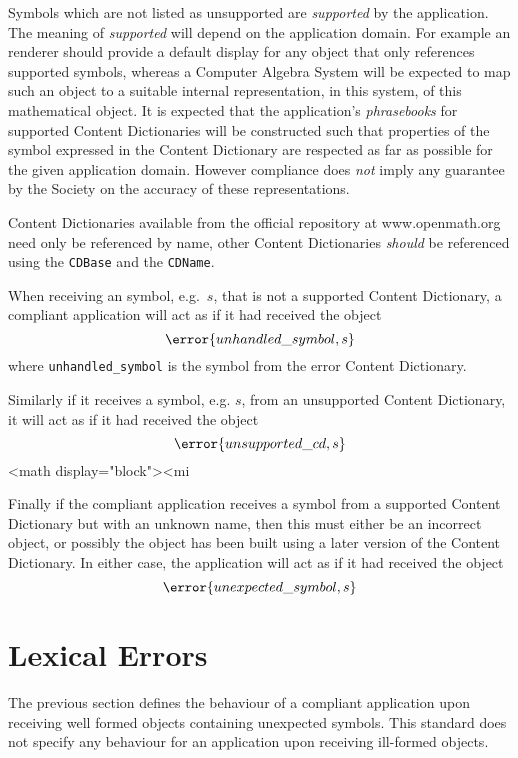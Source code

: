 Symbols which are not listed as unsupported are \emph{supported} by the application. The
meaning of \emph{supported} will depend on the application domain. For example an \OM
renderer should provide a default display for any \OM object that only references
supported symbols, whereas a Computer Algebra System will be expected to map such an
object to a suitable internal representation, in this system, of this mathematical
object. It is expected that the application's \emph{phrasebooks} for supported Content
Dictionaries will be constructed such that properties of the symbol expressed in the
Content Dictionary are respected as far as possible for the given application
domain. However \OM compliance does \emph{not} imply any guarantee by the \OM Society on
the accuracy of these representations.

Content Dictionaries available from the official \OM repository at www.openmath.org need
only be referenced by name, other Content Dictionaries \emph{should} be referenced using
the \lstinline|CDBase| and the \lstinline|CDName|.


When receiving an \OM symbol, e.g.~$s$, that is not a supported Content Dictionary, a
compliant application will act as if it had received the \OM object 
\[\error{unhandled\_symbol,s}\]
where \lstinline|unhandled_symbol| is the symbol from the error Content Dictionary.



Similarly if it receives a symbol, e.g. $s$,
from an unsupported Content Dictionary, it will act as if it had
received the \OM object 
\[\error{unsupported\_cd,s}\]
<math display="block"><mi


Finally if the compliant application receives a symbol from a
supported Content Dictionary but with an unknown name, then this must
either be an incorrect object, or possibly the object has been built
using a later version of the Content Dictionary. In either case, the
application will act as if it had received the \OM object
\[\error{unexpected\_symbol,s}\]

\section{Lexical Errors}\label{sec_comp_lex}

The previous section defines the behaviour of a compliant application upon receiving well
formed \OM objects containing unexpected symbols.  This standard does not specify any
behaviour for an application upon receiving ill-formed objects.

